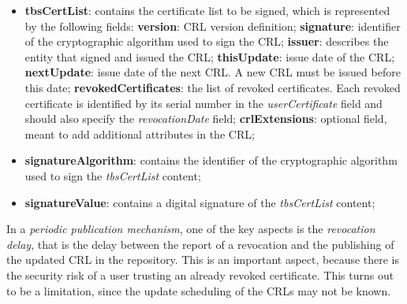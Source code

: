\begin{itemize}
	\item \textbf{tbsCertList}: contains the certificate list to be signed, which is represented by the following fields:
		\subitem \textbf{version}: \ac{CRL} version definition;
		\subitem \textbf{signature}: identifier of the cryptographic algorithm used to sign the \ac{CRL};
		\subitem \textbf{issuer}: describes the entity that signed and issued the CRL;
		\subitem \textbf{thisUpdate}: issue date of the \ac{CRL};
		\subitem \textbf{nextUpdate}: issue date of the next \ac{CRL}. A new \ac{CRL} must be issued before this date;
		\subitem \textbf{revokedCertificates}: the list of revoked certificates. Each revoked certificate is identified by its serial number in the \textit{userCertificate} field and should also specify the \textit{revocationDate} field;
		\subitem \textbf{crlExtensions}: optional field, meant to add additional attributes in the \ac{CRL};
	\item \textbf{signatureAlgorithm}: contains the identifier of the cryptographic algorithm used to sign the \textit{tbsCertList} content;
	\item \textbf{signatureValue}: contains a digital signature of the \textit{tbsCertList} content;
\end{itemize}

In a \textit{periodic publication mechanism}, one of the key aspects is the
\textit{revocation delay}, that is the delay between the report of a revocation and the publishing of the updated \ac{CRL} in the repository.
This is an important  aspect, because there is the security risk of a user trusting an already revoked certificate.
This turns out to be a limitation, since the update scheduling of the \acp{CRL} may not be known.

